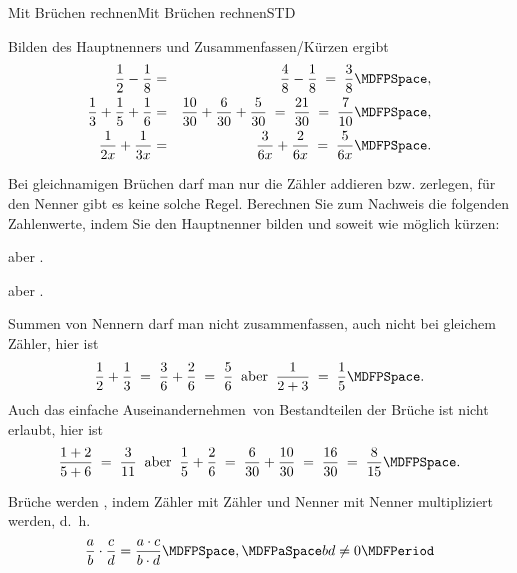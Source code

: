 \begin{MXContent}{Mit Brüchen rechnen}{Mit Brüchen rechnen}{STD}
\begin{MExercise}
\begin{MHint}{\iSolution}
Bilden des Hauptnenners und Zusammenfassen/Kürzen ergibt
\begin{eqnarray*}
\Mdfrac12-\Mdfrac18 & = & \Mdfrac48-\Mdfrac18 \;=\; \Mdfrac38 \MDFPSpace ,\\
\Mdfrac13+\Mdfrac15+\Mdfrac16 & = & \Mdfrac{10}{30}+\Mdfrac6{30}+\Mdfrac{5}{30} \;=\; \Mdfrac{21}{30} \;=\; \Mdfrac{7}{10}\MDFPSpace ,\\
\Mdfrac1{2x}+\Mdfrac1{3x} & = & \Mdfrac{3}{6x}+\Mdfrac{2}{6x} \;=\; \Mdfrac{5}{6x} \MDFPSpace .
\end{eqnarray*}
\end{MHint}
\end{MExercise}

\begin{MExercise}
Bei gleichnamigen Brüchen darf man nur die Zähler addieren bzw. zerlegen, für den Nenner gibt es keine solche Regel.
Berechnen Sie zum Nachweis die folgenden Zahlenwerte, indem Sie den Hauptnenner bilden und soweit wie möglich kürzen:
\begin{MExerciseItems}
\item{ aber .}
\item{ aber .}
\end{MExerciseItems}
\begin{MHint}{\iSolution}
Summen von Nennern darf man nicht zusammenfassen, auch nicht bei gleichem Zähler, hier ist
$$
\Mdfrac12+\Mdfrac13\;=\; \Mdfrac{3}{6}+\Mdfrac26 \;=\; \Mdfrac56\;\;\text{aber}\;\;
\Mdfrac{1}{2+3} \;=\; \Mdfrac15\MDFPSpace .
$$
Auch das einfache \glqq Auseinandernehmen\grqq\ von Bestandteilen der Brüche ist nicht erlaubt, hier ist
$$
\Mdfrac{1+2}{5+6} \;=\; \Mdfrac{3}{11}  \;\;\text{aber}\;\; \Mdfrac15+\Mdfrac26 \;=\; \Mdfrac{6}{30}+\Mdfrac{10}{30} \;=\; \Mdfrac{16}{30}\;=\; \Mdfrac{8}{15}\MDFPSpace .
$$
\end{MHint}
\end{MExercise}

\begin{MInfo}
Brüche werden , indem Zähler mit Zähler und Nenner mit Nenner multipliziert werden, d.~h. 
$$\Mdfrac{a}{b} \cdot \Mdfrac{c}{d} = \Mdfrac{a\cdot c}{b\cdot d}\MDFPSpace, \MDFPaSpace b d\neq 0 \MDFPeriod$$
\end{MInfo}


\end{MXContent}

